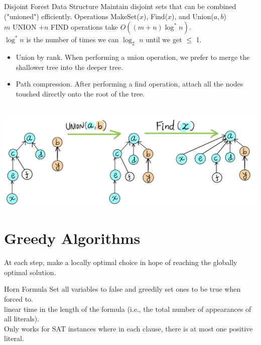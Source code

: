 \documentclass[10pt,a4paper]{article}
\begin{document}
\begin{multicols}{3}
\begin{textbox}{Disjoint Forest Data Structure} 
    Maintain disjoint sets that can be combined ("unioned") efficiently. Operations MakeSet($x$), Find($x$), and Union($a, b$)\\
    \linebreak
     $m$ UNION $+ n$ FIND operations take $O((m + n) \log^* n)$.\\
     $\log^* n$ is the number of times we can $\log_2$ $n$ until we get $\leq$ 1.\\
    \begin{itemize}
        \item Union by rank. When performing a union operation, we prefer to merge the shallower tree into the deeper tree.
        \item Path compression. After performing a find operation, attach all the nodes touched directly onto the root of the tree.
    \end{itemize}
    \\
    \includegraphics[width=\textwidth]{images/Union-Find.jpeg}
\end{textbox}

\section{Greedy Algorithms}

\begin{textbox}{}
     At each step, make a locally optimal choice in hope of reaching the globally optimal solution. \\
\end{textbox}
\begin{textbox}{Horn Formula}
     Set all variables to false and greedily set ones to be true when forced to.\\
    \linebreak
     linear time in the length of the formula (i.e., the total number of appearances of all literals). \\
    \linebreak
     Only works for SAT instances where in each clause, there is at most one positive literal.
\end{textbox}


\end{multicols}
\end{document}
